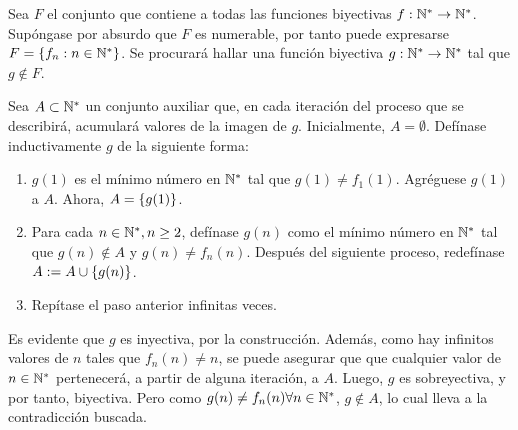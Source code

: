 
Sea $F$ el conjunto que contiene a todas las funciones biyectivas $f:\mathbb{N}^*\to\mathbb{N}^*$. Supóngase por absurdo que $F$ es numerable, por tanto puede expresarse $F = \left\{f_n: n\in\mathbb{N}^*\right\}$.
Se procurará hallar una función biyectiva $g:\mathbb{N}^*\to\mathbb{N}^*$ tal que $g\notin F$.

Sea $A\subset\mathbb{N}^*$ un conjunto auxiliar que, en cada iteración del proceso que se describirá, acumulará valores de la imagen de $g$. Inicialmente, $A=\emptyset$. Defínase inductivamente $g$ de la siguiente forma:

\begin{enumerate}
	\item $g(1)$ es el mínimo número en $\mathbb{N}^*$ tal que $g(1) \neq f_1(1)$. Agréguese $g(1)$ a $A$. Ahora, $A = \left\{g(1)\right\}$.
	\item Para cada $n\in\mathbb{N}^*,n\geq 2$, defínase $g(n)$ como el mínimo número en $\mathbb{N}^*$ tal que $g(n)\notin A$ y $g(n)\neq f_n(n)$. Después del siguiente proceso, redefínase $A := A\cup\left\{g(n)\right\}$.
	\item Repítase el paso anterior infinitas veces.
\end{enumerate}

Es evidente que $g$ es inyectiva, por la construcción. Además, como hay infinitos valores de $n$ tales que $f_n(n) \neq n$, se puede asegurar que que cualquier valor de $n\in\mathbb{N}^*$ pertenecerá, a partir de alguna iteración, a $A$. Luego, $g$ es sobreyectiva, y por tanto, biyectiva.
Pero como $g(n) \neq f_n(n) \forall n\in\mathbb{N}^*$, $g \notin A$, lo cual lleva a la contradicción buscada.